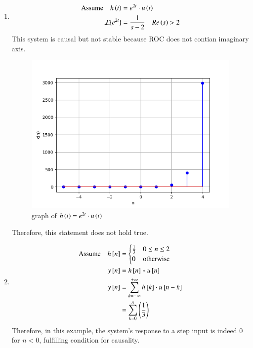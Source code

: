 \documentclass[journal,12pt,twocolumn]{IEEEtran}
\theoremstyle{remark}
\begin{document}
\begin{enumerate}
    \item
    \begin{align}
        \text{Assume}\quad h\left(t\right)&=e^{2t}\cdot u\left(t\right)\\
        \mathcal{L}\{e^{2t}\} &= \frac{1}{s-2}\quad Re\left(s\right)>2
    \end{align}
    This system is causal but not stable because ROC does not contian imaginary axis.
    
    \begin{figure}[ht]
    \renewcommand\thefigure{1}
        \centering
        \includegraphics[width=0.8\linewidth]{figs/graph31.png}
        \caption{graph of $h\left(t\right) = e^{2t}\cdot u\left(t\right)$}
    \end{figure}
    Therefore, this statement does not hold true.
    \item
    \begin{align}
        \text{Assume}\quad h{}\left[n\right] &= \begin{cases} 
                \frac{1}{3} & 0\leq n \leq 2 \\
                0 & \text{otherwise}
        \end{cases}\\
        y{}\left[n\right]&=h{}\left[n\right]*u{}\left[n\right]\\
        y{}\left[n\right]&=\sum_{k=-\infty}^{+\infty}h{}\left[k\right]\cdot u{}\left[n-k\right]\\
        &=\sum_{k=0}^{n}\left(\frac{1}{3}\right)
    \end{align}
    Therefore, in this example, the system's response to a step input is indeed $0$ for $n<0$, fulfilling condition for causality.\\
    \begin{figure}[h!]
    \renewcommand\thefigure{2}

\end{figure}
\end{enumerate}
\end{document}

